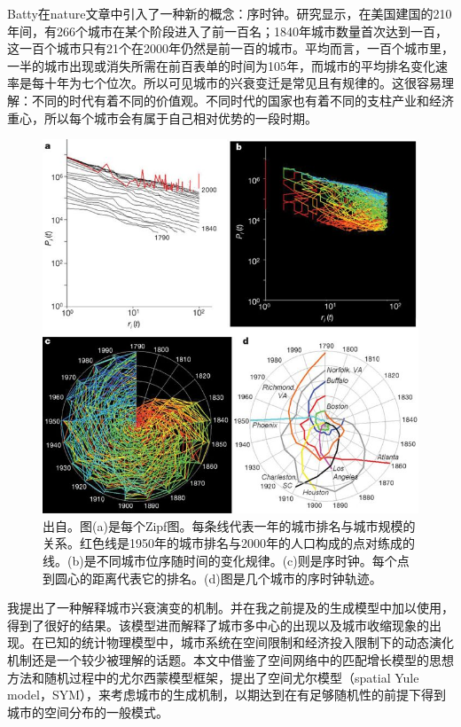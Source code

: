 Batty在nature文章\cite{Batty2006}中引入了一种新的概念：序时钟。研究显示，在美国建国的210年间，有266个城市在某个阶段进入了前一百名；1840年城市数量首次达到一百，这一百个城市只有21个在2000年仍然是前一百的城市。平均而言，一百个城市里，一半的城市出现或消失所需在前百表单的时间为105年，而城市的平均排名变化速率是每十年为七个位次。所以可见城市的兴衰变迁是常见且有规律的。这很容易理解：不同的时代有着不同的价值观。不同时代的国家也有着不同的支柱产业和经济重心，所以每个城市会有属于自己相对优势的一段时期。

\begin{figure}
    \centering
    \includegraphics[width = 0.9\linewidth]{pictures/rankclocks.jpg}
    \caption{出自\cite{Batty2006}。图(a)是每个Zipf图。每条线代表一年的城市排名与城市规模的关系。红色线是1950年的城市排名与2000年的人口构成的点对练成的线。(b)是不同城市位序随时间的变化规律。(c)则是序时钟。每个点到圆心的距离代表它的排名。(d)图是几个城市的序时钟轨迹。}
\end{figure}

我提出了一种解释城市兴衰演变的机制。并在我之前提及的生成模型中加以使用，得到了很好的结果。该模型进而解释了城市多中心的出现以及城市收缩\cite{martinezfernandez2012shrinking}现象的出现。在已知的统计物理模型中，城市系统在空间限制和经济投入限制下的动态演化机制还是一个较少被理解的话题。本文中借鉴了空间网络中的匹配增长模型的思想方法和随机过程中的尤尔西蒙模型框架，提出了空间尤尔模型（spatial Yule model，SYM），来考虑城市的生成机制，以期达到在有足够随机性的前提下得到城市的空间分布的一般模式。

